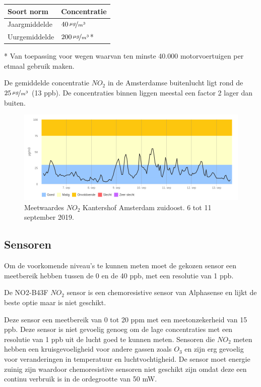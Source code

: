 \documentclass[a4paper, 11pt]{article} %
\begin{document}
\begin{center}
	\begin{tabular}{ | m{5cm} | m{5cm}| } 
		\hline
		Soort norm & Concentratie \\
		\hline
		Jaargmiddelde & $40\,\nicefrac{\mu g}{m^{3}}$
		\\ 
		\hline
		Uurgemiddelde & $200\,\nicefrac{\mu g}{m^{3}}$* 
		\\ 
		\hline
	\end{tabular}
\end{center}

* Van toepassing voor wegen waarvan ten minste 40.000 motorvoertuigen per etmaal gebruik maken.

De gemiddelde concentratie $NO_2$ in de Amsterdamse buitenlucht ligt rond de $25\,\nicefrac{\mu g}{m^{3}}$ (13 ppb). De concentraties binnen liggen meestal een factor 2 lager dan buiten. 

\begin{figure}
    \centering
    \includegraphics[width=.9\linewidth]{amsterdam.png}
    \caption{Meetwaardes $NO_2$ Kantershof Amsterdam zuidoost. 6 tot 11 september 2019.}
    \label{fig:grafiek}
\end{figure}

\subsection{Sensoren}

Om de voorkomende niveau's te kunnen meten moet de gekozen sensor een meetbereik hebben tussen de 0 en de 40 ppb, met een resolutie van 1 ppb. 

De NO2-B43F $NO_2$ sensor is een chemoresistive sensor van Alphasense en lijkt de beste optie maar is niet geschikt.

Deze sensor een meetbereik van 0 tot 20 ppm met een meetonzekerheid van 15 ppb. Deze sensor is niet gevoelig genoeg om de lage concentraties met een resolutie van 1 ppb uit de lucht goed te kunnen meten. 
Sensoren die $NO_2$ meten hebben een kruisgevoeligheid voor andere gassen zoals $O_3$ en zijn erg gevoelig voor veranderingen in temperatuur en luchtvochtigheid. 
De sensor moet energie zuinig zijn waardoor chemoresistive sensoren niet geschikt zijn omdat deze een continu verbruik is in de ordegrootte van 50 mW. 
\end{document}

